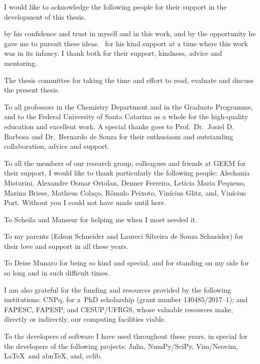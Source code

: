\begin{agradecimentos}[Acknowledgements]
	I would like to acknowledge the following people for their support in the
	development of this thesis.

	\imprimirorientador{} by his confidence and trust in myself and in this work, and by the
	opportunity he gave me to pursuit these ideas.
	\imprimircoorientador\ for his kind support at a time where this work was in its
	infancy.
	I thank both for their support, kindness, advice and mentoring.

	The thesis committee for taking the time and effort to read, evaluate and
	discuss the present thesis.

	To all professors in the Chemistry Department and in the Graduate Programme, and to the Federal University of
	Santa Catarina as a whole
	for the high-quality education and excellent work.
	A special thanks goes to Prof.\ Dr.\ Josiel D. Barbosa and
	Dr.\ Bernardo de Souza
	for their enthusiasm and outstanding collaboration, advice and support.

	To all the members of our research group, colleagues and friends at GEEM for
	their support.
	I would like to thank particularly the following people:
	Alechania Misturini,
	Alexandre Osmar Ortolan,
	Denner Ferreira,
	Letícia Maria Pequeno,
	Marina Briese,
	Matheus Colaço,
	Rômulo Peixoto,
	Vinícius Glitz,
	and,
	Vinícius Port.
	Without you I could not have made until here.

	To Scheila and Manssur for helping me when I most needed it.

	To my parents (Edson Schneider and Laureci Silveira de Souza Schneider)
	for their love and support in all these years.

	To Deise Munaro for being so kind and special,
	and for standing on my side for so long and in such difficult times.

	I am also grateful for the funding and resources provided by the following institutions:
	CNPq, for a~PhD scholarship (grant number 140485/2017--1);
	and FAPESC, FAPESP, and CESUP/UFRGS, whose valuable resources make, directly or
	indirectly, our computing facilities
	viable.

	To the developers of software I have used throughout these years, in special for
	the developers of the following projects:
	Julia,
	NumPy/SciPy,
	Vim/Neovim,
	\LaTeX\ and abn\TeX{},
	and,
	cclib.

\end{agradecimentos}
